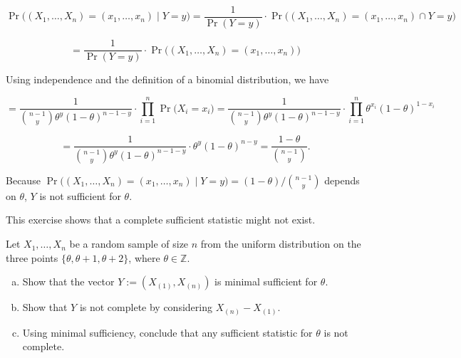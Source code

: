 \begin{example}
\[
\Pr\big( (X_1, \ldots, X_n) = (x_1, \ldots, x_n) \mid Y = y \big) = \frac{1}{\Pr(Y=y)} \cdot \Pr\big( (X_1, \ldots, X_n) = (x_1, \ldots, x_n) \cap Y = y \big) 
\]

\[
= \frac{1}{\Pr(Y=y)} \cdot \Pr\big( (X_1, \ldots, X_n) = (x_1, \ldots, x_n) \big) 
\]

Using independence and the definition of a binomial distribution, we have

\[
= \frac{1}{\binom{n-1}{y} \theta^y (1 - \theta)^{n-1-y}} \cdot \prod_{i=1}^n \Pr\big( X_i = x_i \big)  =  \frac{1}{\binom{n-1}{y} \theta^y (1 - \theta)^{n-1-y}}  \cdot \prod_{i=1}^n \theta^{x_i} (1- \theta)^{1-x_i}
\]

\[
=  \frac{1}{\binom{n-1}{y} \theta^y (1 - \theta)^{n-1-y}} \cdot \theta^{y} (1- \theta)^{n-y} = \frac{1-\theta}{\binom{n-1}{y}}.
\]

Because \(\Pr\big( (X_1, \ldots, X_n) = (x_1, \ldots, x_n) \mid Y = y \big)  = (1-\theta)/\binom{n-1}{y} \) depends on \(\theta\), \(Y\) is not sufficient for \(\theta\).

\end{example}

\begin{exercise}
This exercise shows that a complete sufficient statistic might not exist.

Let $X_{1},\ldots,X_{n}$ be a random sample of size $n$ from the uniform distribution on the three points $\{\theta,\theta+1,\theta+2\}$, where $\theta\in \mathbb{Z}$.
\begin{enumerate}[(a)]
\item Show that the vector $Y:= (X_{(1)},X_{(n)})$ is minimal sufficient for $\theta$.
\item Show that $Y$ is not complete by considering $X_{(n)}-X_{(1)}$.
\item Using minimal sufficiency, conclude that any sufficient statistic for $\theta$ is not complete.
\end{enumerate}
\end{exercise}

